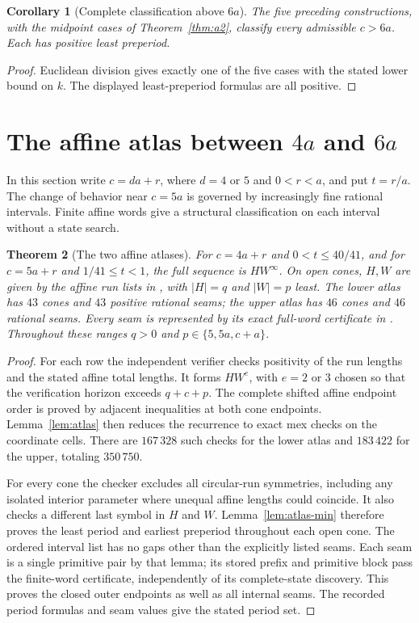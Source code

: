 \documentclass[11pt]{article}
\newtheorem{theorem}{Theorem}[section]
\newtheorem{corollary}[theorem]{Corollary}
\theoremstyle{remark}\newtheorem{remark}[theorem]{Remark}
\newcommand{\per}{^{\infty}}
\begin{document}
\begin{corollary}[Complete classification above $6a$]\label{cor:large}
The five preceding constructions, with the midpoint cases of Theorem~\ref{thm:a2}, classify every admissible $c>6a$. Each has positive least preperiod.
\end{corollary}
\begin{proof}
Euclidean division gives exactly one of the five cases with the stated lower bound on $k$. The displayed least-preperiod formulas are all positive.
\end{proof}


\section{The affine atlas between \texorpdfstring{$4a$}{4a} and \texorpdfstring{$6a$}{6a}}\label{sec:atlas}
In this section write $c=da+r$, where $d=4$ or $5$ and $0<r<a$, and put $t=r/a$. The change of behavior near $c=5a$ is governed by increasingly fine rational intervals. Finite affine words give a structural classification on each interval without a state search.

\begin{theorem}[The two affine atlases]\label{thm:atlas}
For $c=4a+r$ and $0<t\le40/41$, and for $c=5a+r$ and $1/41\le t<1$, the full sequence is $HW\per$. On open cones, $H,W$ are given by the affine run lists in , with $|H|=q$ and $|W|=p$ least. The lower atlas has $43$ cones and $43$ positive rational seams; the upper atlas has $46$ cones and $46$ rational seams. Every seam is represented by its exact full-word certificate in . Throughout these ranges $q>0$ and $p\in\{5,5a,c+a\}$.
\end{theorem}
\begin{proof}
For each row the independent verifier checks positivity of the run lengths and the stated affine total lengths. It forms $HW^e$, with $e=2$ or $3$ chosen so that the verification horizon exceeds $q+c+p$. The complete shifted affine endpoint order is proved by adjacent inequalities at both cone endpoints. Lemma~\ref{lem:atlas} then reduces the recurrence to exact mex checks on the coordinate cells. There are $167\,328$ such checks for the lower atlas and $183\,422$ for the upper, totaling $350\,750$.

For every cone the checker excludes all circular-run symmetries, including any isolated interior parameter where unequal affine lengths could coincide. It also checks a different last symbol in $H$ and $W$. Lemma~\ref{lem:atlas-min} therefore proves the least period and earliest preperiod throughout each open cone. The ordered interval list has no gaps other than the explicitly listed seams. Each seam is a single primitive pair by that lemma; its stored prefix and primitive block pass the finite-word certificate, independently of its complete-state discovery. This proves the closed outer endpoints as well as all internal seams. The recorded period formulas and seam values give the stated period set.
\end{proof}
\end{document}
